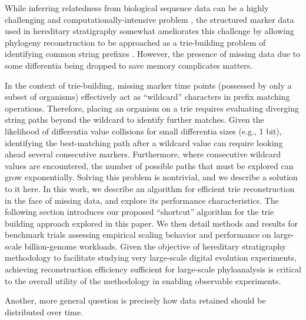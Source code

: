 While inferring relatedness from biological sequence data can be a highly challenging and computationally-intensive problem \citep{miller2010creating,neyman1971molecular,lemmon2013high},
the structured marker data used in hereditary stratigraphy somewhat ameliorates this challenge by allowing phylogeny reconstruction to be approached as a trie-building problem of identifying common string prefixes \citep{delabriandais1959file,moreno2024analysis}.
However, the presence of missing data due to some differentia being dropped to save memory complicates matters.

In the context of trie-building, missing marker time points (possessed by only a subset of organisms) effectively act as ``wildcard'' characters in prefix matching operations.
Therefore, placing an organism on a trie requires evaluating diverging string paths beyond the wildcard to identify further matches.
Given the likelihood of differentia value collisions for small differentia sizes (e.g., 1 bit), identifying the best-matching path after a wildcard value can require looking ahead several consecutive markers.
Furthermore, where consecutive wildcard values are encountered, the number of possible paths that must be explored can grow exponentially.
Solving this problem is nontrivial, and we describe a solution to it here.
In this work, we describe an algorithm for efficient trie reconstruction in the face of missing data, and explore its performance characteristics.
The following section introduces our proposed ``shortcut'' algorithm for the trie building approach explored in this paper.
We then detail methods and results for benchmark trials assessing empirical scaling behavior and performance on large-scale billion-genome workloads.
Given the objective of hereditary stratigraphy methodology to facilitate studying very large-scale digital evolution experiments, achieving reconstruction efficiency sufficient for large-scale phyloanalysis is critical to the overall utility of the methodology in enabling observable experiments.

Another, more general question is precisely how data retained should be distributed over time.

